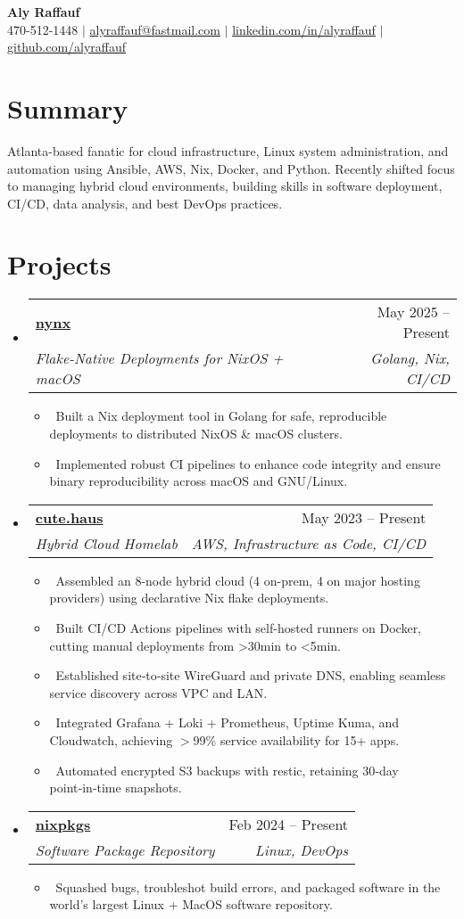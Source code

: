 \documentclass[letterpaper,10pt]{article}
\makeatletter
\newcommand{\resumeItem}[1]{
\item\small{#1}}
\newcommand{\resumeSubheading}[4]{
  \vspace{-1pt}
\item
  \begin{tabular*}{0.97\textwidth}[t]{l@{\extracolsep{\fill}}r}
    \textbf{#1} & #2 \\
    \textit{#3} & \textit{#4} \\
  \end{tabular*}\vspace{-7pt}
}
\newcommand{\resumeSubHeadingList}{
\begin{itemize}[leftmargin=0.15in, label={}]}
\newcommand{\resumeSubHeadingListEnd}{
  \end{itemize}}
\makeatother
\begin{document}
\begin{center}
  \textbf{\Huge Aly Raffauf} \\
  \small 470-512-1448 $|$
  \href{mailto:alyraffauf@fastmail.com}{alyraffauf@fastmail.com} $|$
  \href{https://linkedin.com/in/alyraffauf}{linkedin.com/in/alyraffauf} $|$
  \href{https://github.com/alyraffauf}{github.com/alyraffauf}
\end{center}

\section{Summary}
Atlanta-based fanatic for cloud infrastructure, Linux system
administration, and automation using Ansible, AWS, Nix, Docker, and
Python. Recently shifted focus to managing hybrid cloud environments,
building skills in software deployment, CI/CD, data analysis, and
best DevOps practices.

\section{Projects}
\resumeSubHeadingList
\resumeSubheading
{\href{https://github.com/alyraffauf/nynx}{nynx}}{May 2025 -- Present}
{Flake-Native Deployments for NixOS + macOS}{Golang, Nix, CI/CD}
\resumeSubHeadingList
\resumeItem{\textbullet\ Built a Nix deployment tool in Golang for
safe, reproducible deployments to distributed NixOS \& macOS clusters.}
\resumeItem{\textbullet\ Implemented robust CI pipelines to enhance
code integrity and ensure binary reproducibility across macOS and GNU/Linux.}
\resumeSubHeadingListEnd
\resumeSubheading
{\href{https://cute.haus}{cute.haus}}{May 2023 -- Present}
{Hybrid Cloud Homelab}{AWS, Infrastructure as Code, CI/CD}
\resumeSubHeadingList
\resumeItem{\textbullet\ Assembled an 8-node hybrid
  cloud (4 on-prem, 4 on major hosting providers) using declarative Nix
flake deployments.}
\resumeItem{\textbullet\ Built CI/CD Actions pipelines with
self-hosted runners on Docker, cutting manual deployments from >30min to <5min.}
\resumeItem{\textbullet\ Established site‑to‑site WireGuard and
private DNS, enabling seamless service discovery across VPC and LAN.}
\resumeItem{\textbullet\ Integrated Grafana + Loki + Prometheus, Uptime
Kuma, and Cloudwatch, achieving $>$99\% service availability for 15+ apps.}
\resumeItem{\textbullet\ Automated encrypted S3 backups
with restic, retaining 30‑day point‑in‑time snapshots.}
\resumeSubHeadingListEnd
\resumeSubheading
{\href{https://github.com/NixOS/nixpkgs}{nixpkgs}}{Feb 2024 -- Present}
{Software Package Repository}{Linux, DevOps}
\resumeSubHeadingList
\resumeItem{\textbullet\ Squashed bugs, troubleshot build errors, and
packaged software in the world's largest Linux + MacOS software repository.}
\resumeSubHeadingListEnd
\resumeSubHeadingListEnd
\end{document}
